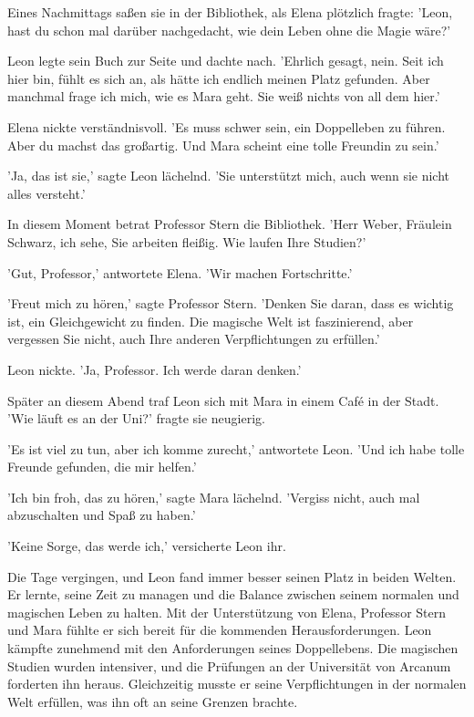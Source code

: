 \documentclass[12pt]{article}
\begin{document}
Eines Nachmittags saßen sie in der Bibliothek, als Elena plötzlich fragte: 'Leon, hast du schon mal darüber nachgedacht, wie dein Leben ohne die Magie wäre?'

Leon legte sein Buch zur Seite und dachte nach. 'Ehrlich gesagt, nein. Seit ich hier bin, fühlt es sich an, als hätte ich endlich meinen Platz gefunden. Aber manchmal frage ich mich, wie es Mara geht. Sie weiß nichts von all dem hier.'

Elena nickte verständnisvoll. 'Es muss schwer sein, ein Doppelleben zu führen. Aber du machst das großartig. Und Mara scheint eine tolle Freundin zu sein.'

'Ja, das ist sie,' sagte Leon lächelnd. 'Sie unterstützt mich, auch wenn sie nicht alles versteht.'

In diesem Moment betrat Professor Stern die Bibliothek. 'Herr Weber, Fräulein Schwarz, ich sehe, Sie arbeiten fleißig. Wie laufen Ihre Studien?'

'Gut, Professor,' antwortete Elena. 'Wir machen Fortschritte.'

'Freut mich zu hören,' sagte Professor Stern. 'Denken Sie daran, dass es wichtig ist, ein Gleichgewicht zu finden. Die magische Welt ist faszinierend, aber vergessen Sie nicht, auch Ihre anderen Verpflichtungen zu erfüllen.'

Leon nickte. 'Ja, Professor. Ich werde daran denken.'

Später an diesem Abend traf Leon sich mit Mara in einem Café in der Stadt. 'Wie läuft es an der Uni?' fragte sie neugierig.

'Es ist viel zu tun, aber ich komme zurecht,' antwortete Leon. 'Und ich habe tolle Freunde gefunden, die mir helfen.'

'Ich bin froh, das zu hören,' sagte Mara lächelnd. 'Vergiss nicht, auch mal abzuschalten und Spaß zu haben.'

'Keine Sorge, das werde ich,' versicherte Leon ihr.

Die Tage vergingen, und Leon fand immer besser seinen Platz in beiden Welten. Er lernte, seine Zeit zu managen und die Balance zwischen seinem normalen und magischen Leben zu halten. Mit der Unterstützung von Elena, Professor Stern und Mara fühlte er sich bereit für die kommenden Herausforderungen. Leon kämpfte zunehmend mit den Anforderungen seines Doppellebens. Die magischen Studien wurden intensiver, und die Prüfungen an der Universität von Arcanum forderten ihn heraus. Gleichzeitig musste er seine Verpflichtungen in der normalen Welt erfüllen, was ihn oft an seine Grenzen brachte.
\end{document}

